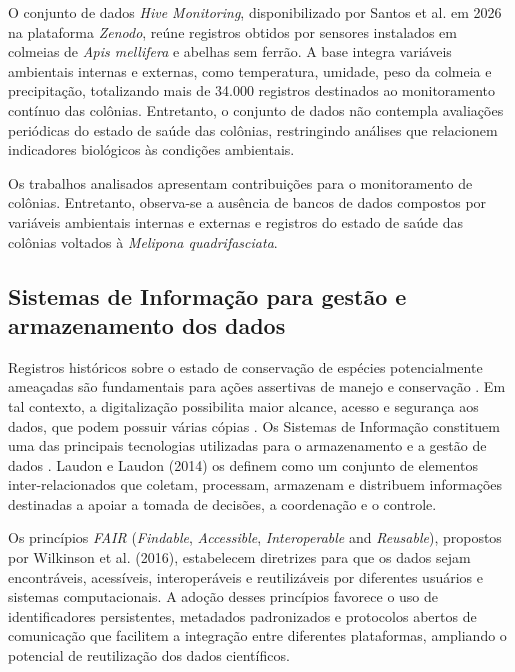 \documentclass[12pt]{unisenaiclass}
\begin{document}
O conjunto de dados \textit{Hive Monitoring}, disponibilizado por Santos et al. em 2026 na plataforma \textit{Zenodo}, reúne registros obtidos por sensores instalados em colmeias de \textit{Apis mellifera} e abelhas sem ferrão. A base integra variáveis ambientais internas e externas, como temperatura, umidade, peso da colmeia e precipitação, totalizando mais de 34.000 registros destinados ao monitoramento contínuo das colônias. Entretanto, o conjunto de dados não contempla avaliações periódicas do estado de saúde das colônias, restringindo análises que relacionem indicadores biológicos às condições ambientais.

Os trabalhos analisados apresentam contribuições para o monitoramento de colônias. Entretanto, observa-se a ausência de bancos de dados compostos por variáveis ambientais internas e externas e registros do estado de saúde das colônias voltados à \textit{Melipona quadrifasciata}.

\subsection{Sistemas de Informação para gestão e armazenamento dos dados}

Registros históricos sobre o estado de conservação de espécies potencialmente ameaçadas são fundamentais para ações assertivas de manejo e conservação \cite{rodriguesiucn2006,macesystem2008,parrextinction2009,rosabutterflies2022}. Em tal contexto, a digitalização possibilita maior alcance, acesso e segurança aos dados, que podem possuir várias cópias \cite{daltonhistory2003,pakniahistory2015,schilthuizespecimens2015,meinekecollections2018,cobbbiodiversity2019,rosabutterflies2022}. Os Sistemas de Informação constituem uma das principais tecnologias utilizadas para o armazenamento e a gestão de dados \cite{rodriguesgestao2024}. Laudon e Laudon (2014) os definem como um conjunto de elementos inter-relacionados que coletam, processam, armazenam e distribuem informações destinadas a apoiar a tomada de decisões, a coordenação e o controle.

Os princípios \textit{FAIR} (\textit{Findable}, \textit{Accessible}, \textit{Interoperable} and \textit{Reusable}), propostos por Wilkinson et al. (2016), estabelecem diretrizes para que os dados sejam encontráveis, acessíveis, interoperáveis e reutilizáveis por diferentes usuários e sistemas computacionais. A adoção desses princípios favorece o uso de identificadores persistentes, metadados padronizados e protocolos abertos de comunicação que facilitem a integração entre diferentes plataformas, ampliando o potencial de reutilização dos dados científicos.
\end{document}
